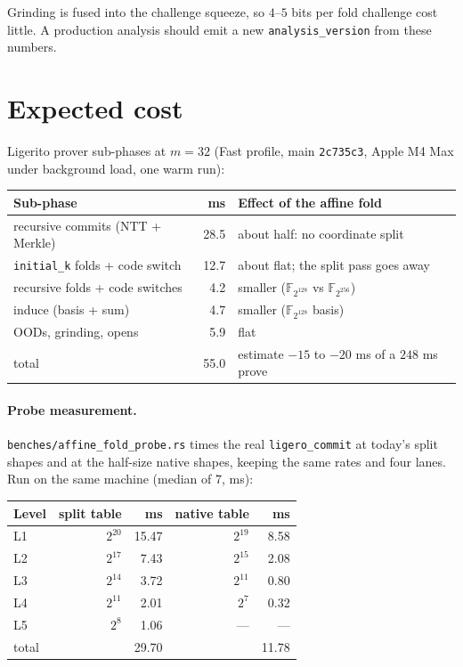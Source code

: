 \documentclass[11pt]{article}
\newcommand{\F}{\mathbb{F}}
\begin{document}
Grinding is fused into the challenge squeeze, so $4$--$5$ bits per fold
challenge cost little. A production analysis should emit a new
\texttt{analysis\_version} from these numbers.

\section{Expected cost}\label{sec:cost}

Ligerito prover sub-phases at $m = 32$ (Fast profile, main
\texttt{2c735c3}, Apple M4 Max under background load, one warm run):

\begin{center}
\begin{tabular}{@{}lrl@{}}
\toprule
Sub-phase & ms & Effect of the affine fold \\
\midrule
recursive commits (NTT + Merkle) & 28.5 & about half: no coordinate split \\
\texttt{initial\_k} folds + code switch & 12.7 & about flat; the split pass goes away \\
recursive folds + code switches & 4.2 & smaller ($\F_{2^{128}}$ vs $\F_{2^{256}}$) \\
induce (basis + sum) & 4.7 & smaller ($\F_{2^{128}}$ basis) \\
OODs, grinding, opens & 5.9 & flat \\
\midrule
total & 55.0 & estimate $-15$ to $-20$ ms of a $248$ ms prove \\
\bottomrule
\end{tabular}
\end{center}

\paragraph{Probe measurement.} \texttt{benches/affine\_fold\_probe.rs}
times the real \texttt{ligero\_commit} at today's split shapes and at
the half-size native shapes, keeping the same rates and four lanes. Run
on the same machine (median of 7, ms):

\begin{center}
\begin{tabular}{@{}lrrrr@{}}
\toprule
Level & split table & ms & native table & ms \\
\midrule
L1 & $2^{20}$ & 15.47 & $2^{19}$ & 8.58 \\
L2 & $2^{17}$ & 7.43 & $2^{15}$ & 2.08 \\
L3 & $2^{14}$ & 3.72 & $2^{11}$ & 0.80 \\
L4 & $2^{11}$ & 2.01 & $2^{7}$ & 0.32 \\
L5 & $2^{8}$ & 1.06 & --- & --- \\
\midrule
total & & 29.70 & & 11.78 \\
\bottomrule
\end{tabular}
\end{center}
\end{document}
